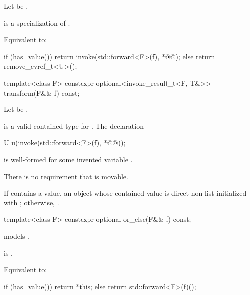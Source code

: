 \begin{itemdescr}
\pnum
Let  be .

\pnum
\mandates
{} is a specialization of .

\pnum
\effects
Equivalent to:
\begin{codeblock}
if (has_value()) {
  return invoke(std::forward<F>(f), *@@);
} else {
  return remove_cvref_t<U>();
}
\end{codeblock}
\end{itemdescr}

%
\begin{itemdecl}
template<class F>
  constexpr optional<invoke_result_t<F, T&>> transform(F&& f) const;
\end{itemdecl}

\begin{itemdescr}
\pnum
Let  be .

\pnum
\mandates
{} is a valid contained type for . The declaration
\begin{codeblock}
U u(invoke(std::forward<F>(f), *@@));
\end{codeblock}
is well-formed for some invented variable .
\begin{note}
There is no requirement that  is movable.
\end{note}

\pnum
\returns
If  contains a value, an  object whose contained value is direct-non-list-initialized with ; otherwise, .
\end{itemdescr}

%
\begin{itemdecl}
template<class F>
  constexpr optional or_else(F&& f) const;
\end{itemdecl}

\begin{itemdescr}
\pnum
\constraints
{} models .

\pnum
\mandates
{} is .

\pnum
\effects
Equivalent to:
\begin{codeblock}
if (has_value()) {
  return *this;
} else {
  return std::forward<F>(f)();
}
\end{codeblock}
\end{itemdescr}

